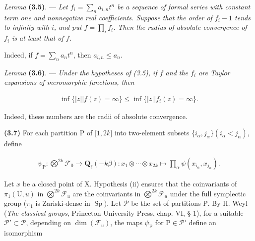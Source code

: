 \documentclass[10pt,leqno]{article}
\begin{document}
\noindent \emph{Lemma} \textbf{(3.5)}. — {\itshape Let \(f_{i}=\sum _{n} a_{i,n}t^{n}\) be a sequence of formal series with constant term one and nonnegative real coefficients. Suppose that the order of \(f_{i}- 1\) tends to infinity with \(i\), and put \(f=\prod _{i} f_{i}\). Then the radius of absolute convergence of \(f_{i}\) is at least that of \(f\).}\par

\noindent Indeed, if \(f=\sum _{n} a_{n} t^{n}\), then \(a_{i,n}\leq a_{n}\).\par

\noindent \emph{Lemma} \textbf{(3.6)}. — {\itshape Under the hypotheses of (3.5), if \(f\) and the \(f_{i}\) are Taylor expansions of meromorphic functions, then}\par

\begin{equation*}\begin{gathered}\operatorname{inf}\{|z| | f(z)=\infty \} \leq  \operatorname{inf}\{|z| | f_{i}(z)=\infty \}.\end{gathered}\end{equation*}

\noindent Indeed, these numbers are the radii of absolute convergence.\par

\clearpage

\label{physical-14}\par\smallskip

\noindent \textbf{(3.7)} For each partition \(\mathrm{P}\) of [\(1,2k]\) into two-element subsets \{\(i_{\alpha },j_{\alpha }\} (i_{\alpha }<j_{\alpha })\), define\par

\begin{equation*}\begin{gathered}\psi _{\mathrm{P}} : \bigotimes\limits^{2k}\mathcal{F} _{0} \longrightarrow  \mathbf{Q}_{\ell }(- k\beta ) : x_{1}\otimes \cdots \otimes x_{2k} \longmapsto  \prod _{\alpha } \psi (x_{i_{\alpha }},x_{j_{\alpha }}).\end{gathered}\end{equation*}

\noindent Let \(x\) be a closed point of \(\mathrm{X}\). Hypothesis (ii) ensures that the coinvariants of \(\pi _{1}(\mathrm{U},u)\) in \(\bigotimes\limits^{2k}\mathcal{F} _{u}\) are the coinvariants in \(\bigotimes\limits^{2k}\mathcal{F} _{u}\) under the full symplectic group (\(\pi _{1}\) is Zariski-dense in \(\operatorname{Sp})\). Let \(\mathcal{P} \) be the set of partitions \(\mathrm{P}\). By \(\mathrm{H}\). Weyl (\emph{The classical groups}, Princeton University Press, chap. VI, § 1), for a suitable \(\mathcal{P} '\subset \mathcal{P} \), depending on \(\operatorname{dim}(\mathcal{F} _{u})\), the maps \(\psi _{\mathrm{P}}\) for \(\mathrm{P}\in \mathcal{P} '\) define an isomorphism\par
\end{document}
